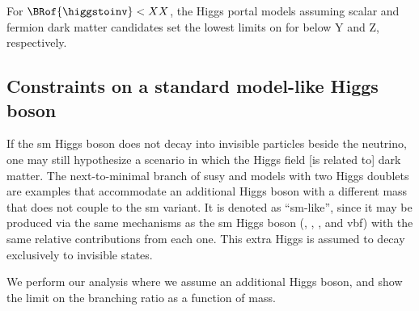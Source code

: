 For $\BRof{\higgstoinv} < XX$, the Higgs portal models assuming scalar and fermion dark matter candidates set the lowest limits on \xsecSI for \mqdark below Y and Z\GeV, respectively.





\subsection{Constraints on a standard model-like Higgs boson}
\label{subsec:htoinv_dark_matter_bsm_higgs}

If the \acrshort{sm} Higgs boson does not decay into invisible particles beside the neutrino, one may still hypothesize a scenario in which the Higgs field [is related to] dark matter. The next-to-minimal branch of \acrlong{susy} and models with two Higgs doublets are examples that accommodate an additional Higgs boson with a different mass that does not couple to the \acrshort{sm} variant. It is denoted as ``\acrlong{sm}-like'', since it may be produced via the same mechanisms as the \acrshort{sm} Higgs boson (\ttH, \VH, \ggH, and \acrshort{vbf}) with the same relative contributions from each one. This extra Higgs is assumed to decay exclusively to invisible states.

We perform our analysis where we assume an additional Higgs boson, and show the limit on the branching ratio as a function of mass.


